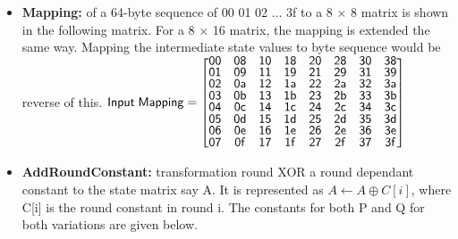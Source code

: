   \begin{itemize}
    \item {\bf Mapping:} of a 64-byte sequence of 00 01 02 $\ldots$ 3f to a 8 $\times$ 8 matrix is shown in the following matrix.
    For a 8 $\times$ 16 matrix, the mapping is extended the same way. Mapping the intermediate state values to byte sequence
    would be reverse of this.
  $   \mathsf{Input\thickspace Mapping} = \renewcommand\arraystretch{0.75}
      \begin{bmatrix}
        \mathsf{00} & \mathsf{08} & \mathsf{10} & \mathsf{18} & \mathsf{20} & \mathsf{28} & \mathsf{30} & \mathsf{38} \\
        \mathsf{01} & \mathsf{09} & \mathsf{11} & \mathsf{19} & \mathsf{21} & \mathsf{29} & \mathsf{31} & \mathsf{39} \\
        \mathsf{02} & \mathsf{0a} & \mathsf{12} & \mathsf{1a} & \mathsf{22} & \mathsf{2a} & \mathsf{32} & \mathsf{3a} \\
        \mathsf{03} & \mathsf{0b} & \mathsf{13} & \mathsf{1b} & \mathsf{23} & \mathsf{2b} & \mathsf{33} & \mathsf{3b} \\
        \mathsf{04} & \mathsf{0c} & \mathsf{14} & \mathsf{1c} & \mathsf{24} & \mathsf{2c} & \mathsf{34} & \mathsf{3c} \\
        \mathsf{05} & \mathsf{0d} & \mathsf{15} & \mathsf{1d} & \mathsf{25} & \mathsf{2d} & \mathsf{35} & \mathsf{3d} \\
        \mathsf{06} & \mathsf{0e} & \mathsf{16} & \mathsf{1e} & \mathsf{26} & \mathsf{2e} & \mathsf{36} & \mathsf{3e} \\
        \mathsf{07} & \mathsf{0f} & \mathsf{17} & \mathsf{1f} & \mathsf{27} & \mathsf{2f} & \mathsf{37} & \mathsf{3f}
      \end{bmatrix}$
    \item {\bf AddRoundConstant:} transformation round XOR a round dependant constant to the state matrix say A. It is
    represented as $A \gets A \oplus C[i]$, where C[i] is the round constant in round i. The constants for both P and Q for both
    variations are given below.


\end{itemize}
